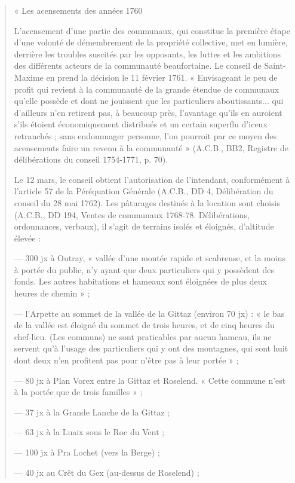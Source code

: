 \documentclass[12pt,a4paper]{report}
\begin{document}
\begin{quote}
	« Les acensements des années 1760
	
	L'acensement d'une partie des communaux, qui constitue la première étape d'une volonté de démembrement de la propriété collective, met en lumière, derrière les troubles suscités par les opposants, les luttes et les ambitions des différents acteurs de la communauté beaufortaine. Le conseil de Saint-Maxime en prend la décision le 11 février 1761. « Envisageant le peu de profit qui revient à la communauté de la grande étendue de communaux qu'elle possède et dont ne jouissent que les particuliers aboutissants... qui d'ailleurs n'en retirent pas, à beaucoup près, l'avantage qu'ils en auroient s'ils étoient économiquement distribués et un certain superflu d'iceux retranchés ; sans endommager personne, l'on pourroit par ce moyen des acensements faire un revenu à la communauté » (A.C.B., BB2, Registre de délibérations du conseil 1754-1771, p. 70).
	
	Le 12 mars, le conseil obtient l'autorisation de l'intendant, conformément à l'article 57 de la Péréquation Générale (A.C.B., DD 4, Délibération du conseil du 28 mai 1762). Les pâturages destinés à la location sont choisis (A.C.B., DD 194, Ventes de communaux 1768-78. Délibérations, ordonnances, verbaux), il s'agit de terrains isolés et éloignés, d'altitude élevée :
	
	— 300 jx à Outray, « vallée d'une montée rapide et scabreuse, et la moins à portée du public, n'y ayant que deux particuliers qui y possèdent des fonds. Les autres habitations et hameaux sont éloignées de plus deux heures de chemin » ;
	
	— l'Arpette au sommet de la vallée de la Gittaz (environ 70 jx) : « le bas de la vallée est éloigné du sommet de trois heures, et de cinq heures du chef-lieu. (Les communs) ne sont praticables par aucun hameau, ils ne servent qu'à l'usage des particuliers qui y ont des montagnes, qui sont huit dont deux n'en profitent pas pour n'être pas à leur portée » ;
	
	— 80 jx à Plan Vorex entre la Gittaz et Roselend. « Cette commune n'est à la portée que de trois familles » ;
	
	— 37 jx à la Grande Lanche de la Gittaz ;
	
	— 63 jx à la Luaix sous le Roc du Vent ;
	
	— 100 jx à Pra Lochet (vers la Berge) ;
	
	— 40 jx au Crêt du Gex (au-dessus de Roselend) ;
	

\end{quote}
\end{document}
